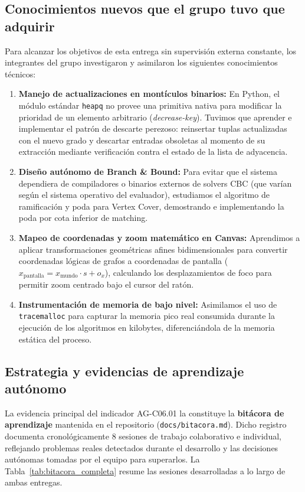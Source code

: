 \documentclass[11pt,a4paper]{article}
\begin{document}
\subsection{Conocimientos nuevos que el grupo tuvo que adquirir}
Para alcanzar los objetivos de esta entrega sin supervisión externa constante, los integrantes del grupo investigaron y asimilaron los siguientes conocimientos técnicos:
\begin{enumerate}[itemsep=2pt]
	\item \textbf{Manejo de actualizaciones en montículos binarios:} En Python, el módulo estándar \texttt{heapq} no provee una primitiva nativa para modificar la prioridad de un elemento arbitrario (\textit{decrease-key}). Tuvimos que aprender e implementar el patrón de descarte perezoso: reinsertar tuplas actualizadas con el nuevo grado y descartar entradas obsoletas al momento de su extracción mediante verificación contra el estado de la lista de adyacencia.
	\item \textbf{Diseño autónomo de Branch \& Bound:} Para evitar que el sistema dependiera de compiladores o binarios externos de solvers CBC (que varían según el sistema operativo del evaluador), estudiamos el algoritmo de ramificación y poda para Vertex Cover, demostrando e implementando la poda por cota inferior de matching.
	\item \textbf{Mapeo de coordenadas y zoom matemático en Canvas:} Aprendimos a aplicar transformaciones geométricas afines bidimensionales para convertir coordenadas lógicas de grafos a coordenadas de pantalla ($x_{\text{pantalla}} = x_{\text{mundo}} \cdot s + o_x$), calculando los desplazamientos de foco para permitir zoom centrado bajo el cursor del ratón.
	\item \textbf{Instrumentación de memoria de bajo nivel:} Asimilamos el uso de \texttt{tracemalloc} para capturar la memoria pico real consumida durante la ejecución de los algoritmos en kilobytes, diferenciándola de la memoria estática del proceso.
\end{enumerate}

\subsection{Estrategia y evidencias de aprendizaje autónomo}
La evidencia principal del indicador AG-C06.01 la constituye la \textbf{bitácora de aprendizaje} mantenida en el repositorio (\texttt{docs/bitacora.md}). Dicho registro documenta cronológicamente 8 sesiones de trabajo colaborativo e individual, reflejando problemas reales detectados durante el desarrollo y las decisiones autónomas tomadas por el equipo para superarlos. La Tabla~\ref{tab:bitacora_completa} resume las sesiones desarrolladas a lo largo de ambas entregas.
\end{document}
